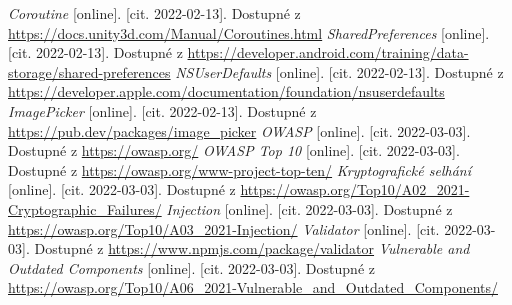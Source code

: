 \begin{thebibliography}{99}
     \textit{Coroutine} [online]. [cit. 2022-02-13]. Dostupné z \url{https://docs.unity3d.com/Manual/Coroutines.html}
     \textit{SharedPreferences} [online]. [cit. 2022-02-13]. Dostupné z \url{https://developer.android.com/training/data-storage/shared-preferences}
     \textit{NSUserDefaults} [online]. [cit. 2022-02-13]. Dostupné z \url{https://developer.apple.com/documentation/foundation/nsuserdefaults}
     \textit{ImagePicker} [online]. [cit. 2022-02-13]. Dostupné z \url{https://pub.dev/packages/image_picker}
     \textit{OWASP} [online]. [cit. 2022-03-03]. Dostupné z \url{https://owasp.org/}
     \textit{OWASP Top 10} [online]. [cit. 2022-03-03]. Dostupné z \url{https://owasp.org/www-project-top-ten/}
     \textit{Kryptografické selhání} [online]. [cit. 2022-03-03]. Dostupné z \url{https://owasp.org/Top10/A02_2021-Cryptographic_Failures/}
     \textit{Injection} [online]. [cit. 2022-03-03]. Dostupné z \url{https://owasp.org/Top10/A03_2021-Injection/}
     \textit{Validator} [online]. [cit. 2022-03-03]. Dostupné z \url{https://www.npmjs.com/package/validator}
     \textit{Vulnerable and Outdated Components} [online]. [cit. 2022-03-03]. Dostupné z \url{https://owasp.org/Top10/A06_2021-Vulnerable_and_Outdated_Components/}
\end{thebibliography}


